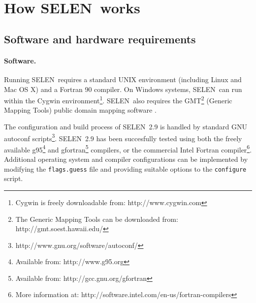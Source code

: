 \documentclass[11pt,fleqn,a4paper,titlepage]{article}
\newcommand\selen{\textsf{SELEN~}}
\newcommand\selens{\textsf{SELEN}}
\begin{document}
{\clearpage

\section{How \selen works}\label{sec:how}

\subsection{Software and hardware requirements}\label{sec:sw-hw}

\paragraph{Software.} Running \selen requires a standard UNIX environment (including Linux and Mac OS X) and a Fortran 90 compiler. On Windows systems, \selen can run within the Cygwin environment\footnote{Cygwin is freely downloadable from: http://www.cygwin.com}. \selen also requires the GMT\footnote{The Generic Mapping Tools can be downloaded from: http://gmt.soest.hawaii.edu/} (Generic Mapping Tools) public domain mapping software \citep{Wessel_and_Smith_1998}.  

The configuration and build process of \selen 2.9 is handled by standard GNU autoconf scripts\footnote{http://www.gnu.org/software/autoconf/}.  \selen 2.9 has been succesfully tested using both the freely available g95\footnote{Available from: http://www.g95.org} and gfortran\footnote{Available from: http://gcc.gnu.org/gfortran} compilers, or the commercial Intel Fortran compiler\footnote{More information at: http://software.intel.com/en-us/fortran-compilers}. Additional operating system and compiler configurations can be implemented by modifying the \texttt{flags.guess} file and providing suitable options to the \texttt{configure} script. 

}
\end{document}
